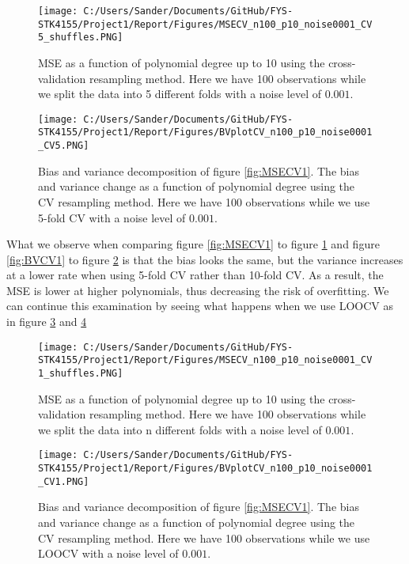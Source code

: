 \documentclass[12pt,a4paper]{article}
\begin{document}
\begin{figure}[H]
\centering
\texttt{[image: C:/Users/Sander/Documents/GitHub/FYS-STK4155/Project1/Report/Figures/MSECV\_n100\_p10\_noise0001\_CV5\_shuffles.PNG]}
\caption{\label{fig:MSECV2} MSE as a function of polynomial degree up to 10 using the cross-validation resampling method. Here we have 100 observations while we split the data into 5 different folds with a noise level of $0.001$.}
\end{figure}

\begin{figure}[H]
\centering
\texttt{[image: C:/Users/Sander/Documents/GitHub/FYS-STK4155/Project1/Report/Figures/BVplotCV\_n100\_p10\_noise0001\_CV5.PNG]}
\caption{\label{fig:BVCV2} Bias and variance decomposition of figure \ref{fig:MSECV1}. The bias and variance change as a function of polynomial degree using the CV resampling method. Here we have 100 observations while we use 5-fold CV with a noise level of $0.001$.}
\end{figure}

\noindent What we observe when comparing figure \ref{fig:MSECV1} to figure \ref{fig:MSECV2} and figure \ref{fig:BVCV1} to figure \ref{fig:BVCV2} is that the bias looks the same, but the variance increases at a lower rate when using 5-fold CV rather than 10-fold CV. As a result, the MSE is lower at higher polynomials, thus decreasing the risk of overfitting. We can continue this examination by seeing what happens when we use LOOCV as in figure \ref{fig:MSECV3} and \ref{fig:BVCV3}

\begin{figure}[H]
\centering
\texttt{[image: C:/Users/Sander/Documents/GitHub/FYS-STK4155/Project1/Report/Figures/MSECV\_n100\_p10\_noise0001\_CV1\_shuffles.PNG]}
\caption{\label{fig:MSECV3} MSE as a function of polynomial degree up to 10 using the cross-validation resampling method. Here we have 100 observations while we split the data into n different folds with a noise level of $0.001$.}
\end{figure}

\begin{figure}[H]
\centering
\texttt{[image: C:/Users/Sander/Documents/GitHub/FYS-STK4155/Project1/Report/Figures/BVplotCV\_n100\_p10\_noise0001\_CV1.PNG]}
\caption{\label{fig:BVCV3} Bias and variance decomposition of figure \ref{fig:MSECV1}. The bias and variance change as a function of polynomial degree using the CV resampling method. Here we have 100 observations while we use LOOCV with a noise level of $0.001$.}
\end{figure}
\end{document}
